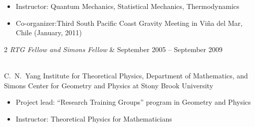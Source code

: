 \documentclass{res}
\begin{document}
{\begin{resume}
\begin{itemize}
\item Instructor: Quantum Mechanics, Statistical Mechanics, Thermodynamics
\item Co-organizer:Third South Pacific Coast Gravity Meeting in Vi\~na del Mar, Chile (January, 2011)
\end{itemize}
\begin{ncolumn}{2}
{\it RTG Fellow and Simons Fellow} & September 2005 -- September 2009
\end{ncolumn}\\  
C.~N.~Yang Institute for Theoretical Physics, Department of Mathematics, and Simons Center for Geometry and Physics at Stony Brook University 
\begin{itemize} \itemsep1pt \parskip0pt 
\item Project lead: ``{Research Training Groups}'' program in Geometry and Physics
\item Instructor: Theoretical Physics for Mathematicians 
\end{itemize}
\end{resume}

\vfill
} %
\end{document}
